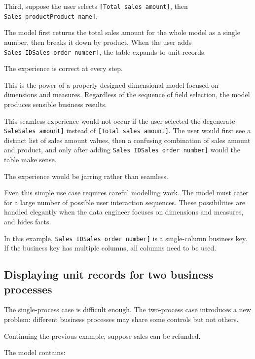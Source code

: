 \documentclass[10pt,openany,10pt]{book}
\begin{document}
Third, suppose the user selects \texttt{{[}Total\ sales\ amount{]}},
then
\texttt{\textquotesingle{}Sales\ product\textquotesingle{}{[}Product\ name{]}}.

The model first returns the total sales amount for the whole model as a
single number, then breaks it down by product. When the user adds
\texttt{\textquotesingle{}Sales\ ID\textquotesingle{}{[}Sales\ order\ number{]}},
the table expands to unit records.

The experience is correct at every step.

This is the power of a properly designed dimensional model focused on
dimensions and measures. Regardless of the sequence of field selection,
the model produces sensible business results.

This seamless experience would not occur if the user selected the
degenerate
\texttt{\textquotesingle{}Sale\textquotesingle{}{[}Sales\ amount{]}}
instead of \texttt{{[}Total\ sales\ amount{]}}. The user would first see
a distinct list of sales amount values, then a confusing combination of
sales amount and product, and only after adding
\texttt{\textquotesingle{}Sales\ ID\textquotesingle{}{[}Sales\ order\ number{]}}
would the table make sense.

The experience would be jarring rather than seamless.

Even this simple use case requires careful modelling work. The model
must cater for a large number of possible user interaction sequences.
These possibilities are handled elegantly when the data engineer focuses
on dimensions and measures, and hides facts.

In this example,
\texttt{\textquotesingle{}Sales\ ID\textquotesingle{}{[}Sales\ order\ number{]}}
is a single-column business key. If the business key has multiple
columns, all columns need to be used.

\subsection{Displaying unit records for two business
processes}\label{displaying-unit-records-for-two-business-processes}

The single-process case is difficult enough. The two-process case
introduces a new problem: different business processes may share some
controls but not others.

Continuing the previous example, suppose sales can be refunded.

The model contains:
\end{document}
